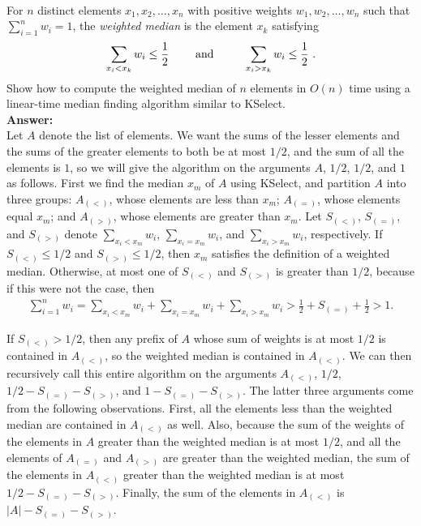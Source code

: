 \documentclass[a4paper,11pt]{article}
\begin{document}
\\
For $n$ distinct elements $x_1, x_2 , \ldots , x_n $ with positive weights $w_1 , w_2 , \ldots , w_n$ such that 
$\sum_{i=1}^n w_i = 1$, the {\em weighted median} is the element $x_k$ satisfying
\begin{displaymath}
\sum_{x_i < x_k} w_i \leq \frac{1}{2}~~~~~~~{\rm and}~~~~~~~~\sum_{x_i > x_k} w_i  \leq \frac{1}{2} ~.
\end{displaymath}
Show how to compute the weighted median of $n$ elements in $O (n)$ time
using a linear-time median finding algorithm similar to KSelect.\\
{\bf Answer:}\\
Let $A$ denote the list of elements. We want the sums of the lesser elements and the sums of the greater elements to both be at most $1/2$, and the sum of all the elements is $1$, so we will give the algorithm on the arguments $A$, $1/2$, $1/2$, and $1$ as follows. First we find the median $x_m$ of $A$ using KSelect, and partition $A$ into three groups: $A_{(<)}$, whose elements are less than $x_m$; $A_{(=)}$, whose elements equal $x_m$; and $A_{(>)}$, whose elements are greater than $x_m$. Let $S_{(<)}$, $S_{(=)}$, and $S_{(>)}$ denote $\sum_{x_i < x_m} w_i$, $\sum_{x_i = x_m} w_i$, and $\sum_{x_i > x_m} w_i$, respectively. If $S_{(<)} \leq 1/2$ and $S_{(>)} \leq 1/2$, then $x_m$ satisfies the definition of a weighted median. Otherwise, at most one of $S_{(<)}$ and $S_{(>)}$ is greater than $1/2$, because if this were not the case, then
\begin{align*}
    \sum_{i = 1}^n w_i = \sum_{x_i < x_m} w_i + \sum_{x_i = x_m} w_i + \sum_{x_i > x_m} w_i > \frac{1}{2} + S_{(=)} + \frac{1}{2} > 1.
\end{align*} \par
If $S_{(<)} > 1/2$, then any prefix of $A$ whose sum of weights is at most $1/2$ is contained in $A_{(<)}$, so the weighted median is contained in $A_{(<)}$. We can then recursively call this entire algorithm on the arguments $A_{(<)}$, $1/2$, $1/2 - S_{(=)} - S_{(>)}$, and $1 - S_{(=)} - S_{(>)}$. The latter three arguments come from the following observations. First, all the elements less than the weighted median are contained in $A_{(<)}$ as well. Also, because the sum of the weights of the elements in $A$ greater than the weighted median is at most $1/2$, and all the elements of $A_{(=)}$ and $A_{(>)}$ are greater than the weighted median, the sum of the elements in $A_{(<)}$ greater than the weighted median is at most $1/2 - S_{(=)} - S_{(>)}$. Finally, the sum of the elements in $A_{(<)}$ is $|A| - S_{(=)} - S_{(>)}$. \par
\end{document}
